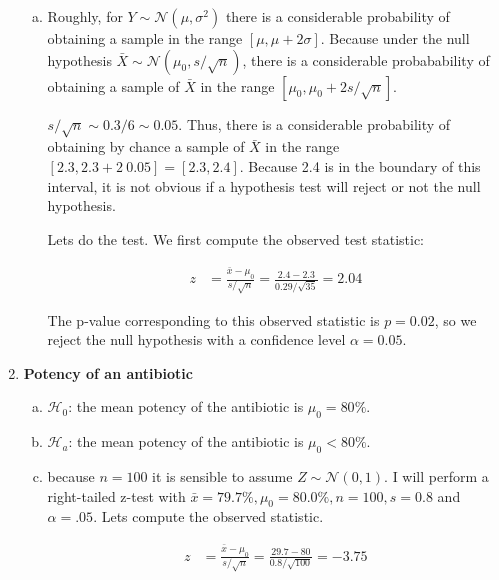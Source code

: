 \documentclass[12pt]{article}
\begin{document}
\begin{enumerate}
\begin{enumerate}[(a)]
            \item Roughly, for $Y\sim\mathcal{N}(\mu,\sigma^2)$ there is a considerable
                probability of obtaining a sample in the range $[\mu,
                \mu+2\sigma]$. Because under the null hypothesis
                $\bar{X}\sim\mathcal{N}(\mu_0,s/\sqrt{n})$, there is a
                considerable probabability of obtaining a sample of $\bar{X}$
                in the range $[\mu_0,\mu_0+2s/\sqrt{n}]$.

                $s/\sqrt{n}\sim 0.3/6\sim 0.05$. Thus, there is a
                considerable probability of obtaining by chance a sample of
                $\bar{X}$ in the range $[2.3, 2.3+2\ 0.05]=[2.3,2.4]$. Because
                2.4 is in the boundary of this interval, it is not obvious if
                a hypothesis test will reject or not the null hypothesis.

                Lets do the test. We first compute the observed test statistic:

                \begin{align*}
                    z&=\frac{\bar{x}-\mu_0}{s/\sqrt{n}}=\frac{2.4-2.3}{0.29/\sqrt{35}}=2.04
                \end{align*}

                The p-value corresponding to this observed statistic is
                $p=0.02$, so we reject the
                null hypothesis with a confidence level $\alpha=0.05$.

        \end{enumerate}

    \item \textbf{Potency of an antibiotic}
        \begin{enumerate}[(a)]
            \item $\mathcal{H}_0$: the mean potency of the antibiotic is $\mu_0=80\%$.
            \item $\mathcal{H}_a$: the mean potency of the antibiotic is $\mu_0<80\%$.
            \item because $n=100$ it is sensible to  assume
                $Z\sim\mathcal{N}(0,1)$. I will perform a right-tailed z-test
                with $\bar{x}=79.7\%, \mu_0=80.0\%, n=100, s=0.8$ and
                $\alpha=.05$. Lets compute the observed statistic.

                \begin{align*}
                    z &= \frac{\bar{x}-\mu_0}{s/\sqrt{n}}=\frac{29.7-80}{0.8/\sqrt{100}}=-3.75
                \end{align*}


\end{enumerate}
\end{enumerate}
\end{document}
